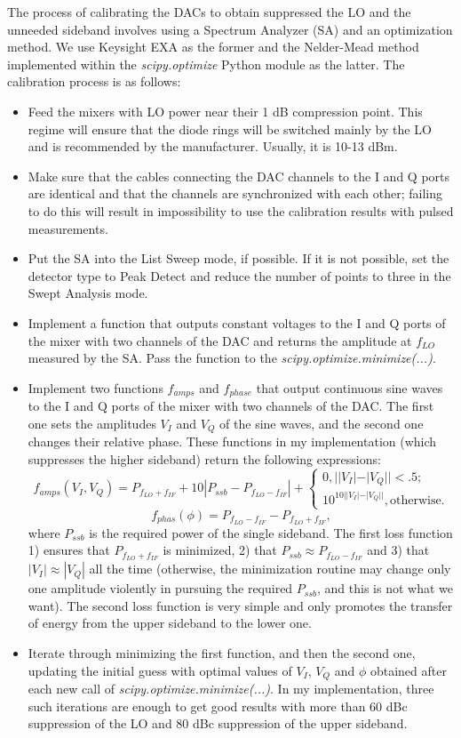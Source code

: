 The process of calibrating the DACs to obtain suppressed the LO and the unneeded sideband involves using a Spectrum Analyzer (SA) and an optimization method. We use Keysight EXA as the former and the Nelder-Mead method implemented within the \textit{scipy.optimize} Python module as the latter. The calibration process is as follows:
\begin{itemize}[topsep=5pt, itemsep=5pt]
\item Feed the mixers with LO power near their 1 dB compression point. This regime will ensure that the diode rings will be switched mainly by the LO and is recommended by the manufacturer. Usually, it is 10-13 dBm.
\item Make sure that the cables connecting the DAC channels to the I and Q ports are identical and that the channels are synchronized with each other; failing to do this will result in impossibility to use the calibration results with pulsed measurements.
\item Put the SA into the List Sweep mode, if possible. If it is not possible, set the detector type to Peak Detect and reduce the number of points to three in the Swept Analysis mode.
\item Implement a function that outputs constant voltages to the I and Q ports of the mixer with two channels of the DAC and returns the amplitude at $f_{LO}$ measured by the SA. Pass the function to the \textit{scipy.optimize.minimize(...)}. 
\item Implement two functions $f_{amps}$ and $f_{phase}$ that output continuous sine waves to the I and Q ports of the mixer with two channels of the DAC. The first one sets the amplitudes $V_I$ and $V_Q$ of the sine waves, and the second one changes their relative phase. These functions in my implementation (which suppresses the higher sideband) return the following expressions:
\[
f_{amps}(V_I, V_Q) = P_{f_{LO}+f_{IF}} + 10 |P_{ssb} - P_{f_{LO}-f_{IF}}| +\begin{cases} 0,  ||V_I| - |V_Q||<.5;\\ 10^{10||V_I| -|V_Q||}, \text{otherwise}.\end{cases}
\]
\[
f_{phas}(\phi) = P_{f_{LO}-f_{IF}} - P_{f_{LO}+f_{IF}},
\]
where $P_{ssb}$ is the required power of the single sideband. The first loss function 1) ensures that $P_{f_{LO}+f_{IF}}$ is minimized, 2) that $P_{ssb} \approx P_{f_{LO}-f_{IF}}$ and 3) that $|V_I| \approx |V_Q|$ all the time (otherwise, the minimization routine may change only one amplitude violently in pursuing the required $P_{ssb}$, and this is not what we want). The second loss function is very simple and only promotes the transfer of energy from the upper sideband to the lower one.
\item Iterate through minimizing the first function, and then the second one, updating the initial guess with optimal values of $V_I$, $V_Q$ and $\phi$ obtained after each new call of \textit{scipy.optimize.minimize(...)}. In my implementation, three such iterations are enough to get good results with more than 60 dBc suppression of the LO and 80 dBc suppression of the upper sideband.
\end{itemize} 
